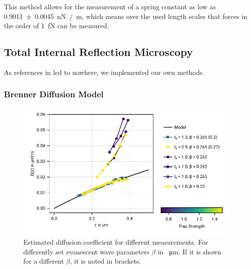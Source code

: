 \documentclass[
    twoside=false,
    twocolumn=true,
    fontsize=11pt,
]{scrarticle}
\begin{document}
This method allows for the measurement of a spring constant as low as \SI{0.9011(45)}{\nano N /m}, which means over the used length scales that forces in the order of \SI{1}{\femto N} can be measured.

\subsection{Total Internal Reflection Microscopy}
As references in \cite{instructions} led to nowhere, we implemented our own methods.

\subsubsection*{Brenner Diffusion Model}
\begin{figure}
    \centering
    \includegraphics{figures/02_04_01_diffusion.pdf}
    \caption{Estimated diffusion coefficient for different measurements. For differently set evanescent wave parameters $\beta$ in \SI{}{\micro m}. If it is shown for a different $\beta$, it is noted in brackets.}
\end{figure}
\end{document}
